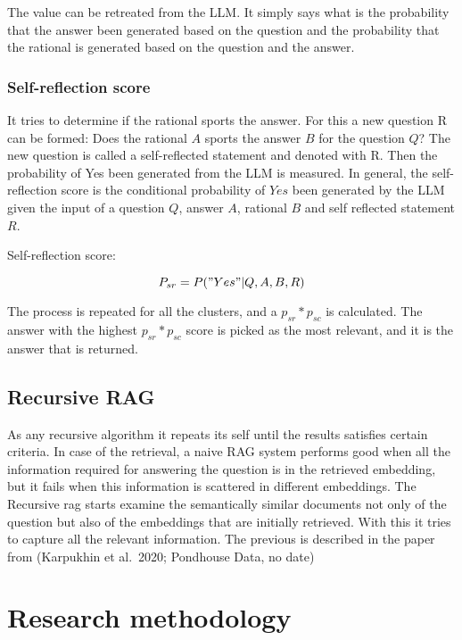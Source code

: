\documentclass{wseas}
\begin{document}
The value can be retreated from the LLM. It simply says what is the
probability that the answer been generated based on the question and the
probability that the rational is generated based on the question and the
answer.

\subsubsection{Self-reflection score}

It tries to determine if the rational sports the answer. For this a new
question R can be formed: Does the rational $A$ sports the answer
$B$ for the question $Q$? The new question is called a
self-reflected statement and denoted with R. Then the probability of Yes
been generated from the LLM is measured. In general, the self-reflection
score is the conditional probability of $Yes$ been generated by the
LLM given the input of a question $Q$, answer $A$, rational $B$ and self
reflected statement $R$.

Self-reflection score: 

\begin{equation}
  P_{sr} = P("Yes"|Q, A, B, R)  
\end{equation}

The process is repeated for all the clusters, and a \(p_{sr}*p_{sc}\) is
calculated. The answer with the highest \(p_{sr}*p_{sc}\) score is
picked as the most relevant, and it is the answer that is returned.


\subsection{Recursive RAG}

As any recursive algorithm it repeats its self until the results
satisfies certain criteria. In case of the retrieval, a naive RAG system
performs good when all the information required for answering the
question is in the retrieved embedding, but it fails when this
information is scattered in different embeddings. The Recursive rag
starts examine the semantically similar documents not only of the
question but also of the embeddings that are initially retrieved. With
this it tries to capture all the relevant information. The previous is
described in the paper from (Karpukhin et al.~2020; Pondhouse Data, no
date) \cite{cite16} \cite{cite17}


\section{Research methodology}
\end{document}
